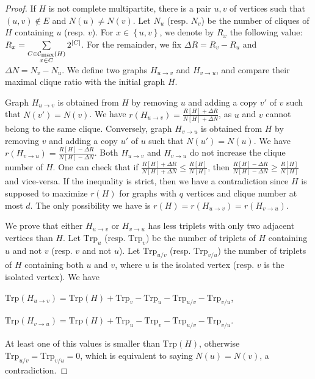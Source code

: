 \documentclass{article}
\newcommand{\set}[1]{\left\{ #1 \right\}}
\newcommand{\card}[1]{\left| #1 \right|}
\newcommand{\mcalcm}{\mathcal{C}_{\mbox{\scriptsize{max}}}}
\newcommand{\trp}{\mbox{Trp}}
\newcommand{\huv}{H_{u \rightarrow v}}
\newcommand{\hvu}{H_{v \rightarrow u}}
\begin{document}
\begin{proof}
If $H$ is not complete multipartite, there is a pair $u,v$ of vertices such that $(u,v) \notin E$ and $N(u) \neq N(v)$. Let $N_u$ (resp. $N_v$) be the number of cliques of $H$ containing $u$ (resp. $v$). For $x \in \set{u,v}$, we denote by $R_x$ the following value: $R_x = \sum\limits_{\substack{C \in \mcalcm(H) \\ x \in C}} 2^{\card{C}}$. For the remainder, we fix $\Delta R = R_v - R_u$ and $\Delta N = N_v - N_u$.
We define two graphs $\huv$ and $\hvu$, and compare their maximal clique ratio with the initial graph $H$.

Graph $\huv$ is obtained from $H$ by removing $u$ and adding a copy $v'$ of $v$ such that $N(v') = N(v)$. We have $r(\huv) = \frac{R\left[ H\right] + \Delta R}{N\left[ H\right] + \Delta N}$, as $u$ and $v$ cannot belong to the same clique. Conversely, graph $\hvu$ is obtained from $H$ by removing $v$ and adding a copy $u'$ of $u$ such that $N(u') = N(u)$. We have $r(\hvu) = \frac{R\left[ H\right] - \Delta R}{N\left[ H\right] - \Delta N}$. Both $\huv$ and $\hvu$ do not increase the clique number of $H$. One can check that if $\frac{R\left[ H\right] + \Delta R}{N\left[ H\right] + \Delta N} \le \frac{R\left[ H\right]}{N\left[ H\right]}$, then $\frac{R\left[ H\right] - \Delta R}{N\left[ H\right] - \Delta N} \ge \frac{R\left[ H\right]}{N\left[ H\right]}$ and vice-versa. If the inequality is strict, then we have a contradiction since $H$ is supposed to maximize $r(H)$ for graphs with $q$ vertices and clique number at most $d$. The only possibility we have is $r(H) = r(\huv) = r(\hvu)$.

We prove that either $\huv$ or $\hvu$ has less triplets with only two adjacent vertices than $H$. Let $\trp_u$ (resp. $\trp_v$) be the number of triplets of $H$ containing $u$ and not $v$ (resp. $v$ and not $u$). Let $\trp_{u/v}$ (resp. $\trp_{v/u}$) the number of triplets of $H$ containing both $u$ and $v$, where $u$ is the isolated vertex (resp. $v$ is the isolated vertex). We have
\begin{description}
    \item $\trp(\huv) = \trp(H) + \trp_v - \trp_u - \trp_{u/v} - \trp_{v/u}$,
    \item $\trp(\hvu) = \trp(H) + \trp_u - \trp_v - \trp_{u/v} - \trp_{v/u}$.
\end{description}
At least one of this values is smaller than $\trp(H)$, otherwise $\trp_{u/v} = \trp_{v/u} = 0$, which is equivalent to saying $N(u) = N(v)$, a contradiction.
\end{proof}
\end{document}
